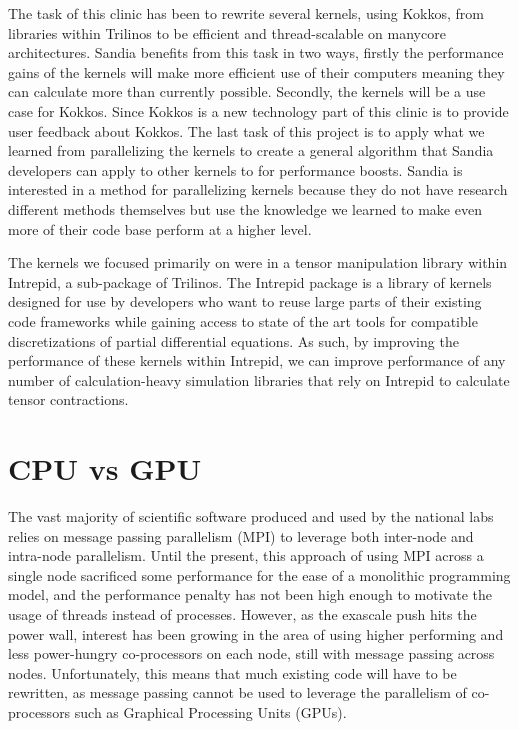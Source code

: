 The task of this clinic has been to rewrite several kernels, using Kokkos, from libraries within
Trilinos to be efficient and thread-scalable on manycore architectures.  Sandia benefits from this task in two ways, firstly the performance gains of the kernels will make more efficient use of their computers meaning they can calculate more than currently possible. Secondly, the kernels will be a use case for Kokkos. Since Kokkos is a new technology part of this clinic is to provide user feedback about Kokkos. The last task of this project is to apply what we learned from parallelizing the kernels to create a general algorithm that Sandia developers can apply to other kernels to for performance boosts. Sandia is interested in a method for parallelizing kernels because they do not have research different methods themselves but use the knowledge we learned to make even more of their code base perform at a higher level.

The kernels we focused primarily on were in a tensor manipulation library within Intrepid, a sub-package of Trilinos. 
The Intrepid package is a library of kernels designed for use by developers who want to reuse large
parts of their existing code frameworks while gaining access to state of the art
tools for compatible discretizations of partial differential equations. As such, by improving the 
performance of these kernels within Intrepid, we can improve performance
of any number of calculation-heavy simulation libraries that rely on Intrepid to calculate tensor contractions.



\section{CPU vs GPU}
The vast
majority of scientific software produced and used by the national labs relies on
message passing parallelism (MPI) to leverage both inter-node and intra-node
parallelism.  
Until the present, this approach of using MPI across a single node
sacrificed some performance for the ease of a monolithic programming model, and
the performance penalty has not been high enough to motivate the usage of
threads instead of processes.  However, as the exascale push hits the power
wall, interest has been growing in the area of using higher performing and less
power-hungry co-processors on each node, still with message passing across
nodes.  Unfortunately, this means that much existing code will have to be rewritten, as
message passing cannot be used to leverage the parallelism of co-processors such
as Graphical Processing Units (GPUs).

